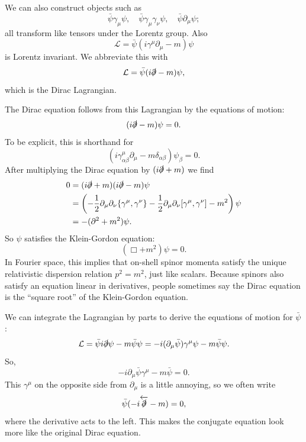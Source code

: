 \documentclass[11pt]{article}
\theoremstyle{definition}
\begin{document}
We can also construct objects such as
\begin{equation}
\bar{\psi}\gamma_{\mu}\psi, \quad \bar{\psi}\gamma_{\mu}\gamma_{\nu}\psi, \quad \bar{\psi}\partial_{\mu}\psi;
\end{equation}
all transform like tensors under the Lorentz group. Also
\begin{equation}
\mathcal{L} = \bar{\psi}(i\gamma^{\mu}\partial_{\mu}-m)\psi
\end{equation}
is Lorentz invariant. We abbreviate this with
\begin{equation}
\mathcal{L} = \bar{\psi}(i\slashed{\partial}-m)\psi,
\end{equation}
which is the Dirac Lagrangian.

The Dirac equation follows from this Lagrangian by the equations of motion:
\begin{equation}
(i\slashed{\partial}-m)\psi=0.
\end{equation}
To be explicit, this is shorthand for
\begin{equation}
(i\gamma^{\mu}_{\alpha\beta}\partial_{\mu}-m\delta_{\alpha\beta})\psi_{\beta}=0.
\end{equation}
After multiplying the Dirac equation by \((i\slashed{\partial}+m)\) we find
\begin{equation}
\begin{split}
0 &= (i\slashed{\partial}+m)(i\slashed{\partial}-m)\psi \\
  &= \left(-\frac{1}{2}\partial_{\mu}\partial_{\nu}\{\gamma^{\mu},\gamma^{\nu}\}
         -\frac{1}{2}\partial_{\mu}\partial_{\nu}[\gamma^{\mu},\gamma^{\nu}]
         -m^{2} \right)\psi \\
  &= -(\partial^{2}+m^{2})\psi.
\end{split}
\end{equation}
So \(\psi\) satisfies the Klein-Gordon equation:
\begin{equation}
(\Box+m^{2})\psi=0.
\end{equation}
In Fourier space, this implies that on-shell spinor momenta satisfy the unique relativistic dispersion relation \(p^{2}=m^{2}\), just like scalars. Because spinors also satisfy an equation linear in derivatives, people sometimes say the Dirac equation is the ``square root'' of the Klein-Gordon equation.

We can integrate the Lagrangian by parts to derive the equations of motion for \(\bar{\psi}\):
\begin{equation}
\mathcal{L} = \bar{\psi}i\slashed{\partial}\psi-m\bar{\psi}\psi
            = -i(\partial_{\mu}\bar{\psi})\gamma^{\mu}\psi-m\bar{\psi}\psi.
\end{equation}
So,
\begin{equation}
-i\partial_{\mu}\bar{\psi}\gamma^{\mu}-m\bar{\psi}=0.
\end{equation}
This \(\gamma^{\mu}\) on the opposite side from \(\partial_{\mu}\) is a little annoying, so we often write
\begin{equation}
\bar{\psi}(-i\overleftarrow{\slashed{\partial}}-m)=0,
\end{equation}
where the derivative acts to the left. This makes the conjugate equation look more like the original Dirac equation.
\end{document}
